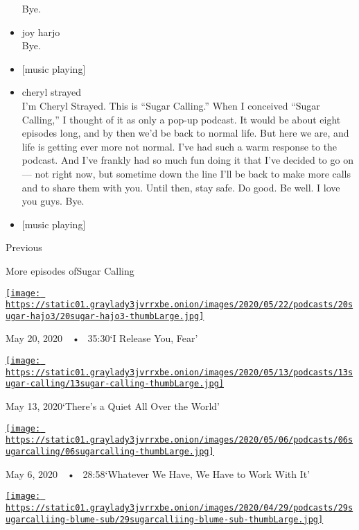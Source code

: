 \begin{itemize}
  Bye.
\item
  joy harjo\\
  Bye.
\item
  {[}music playing{]}
\item
  cheryl strayed\\
  I'm Cheryl Strayed. This is ``Sugar Calling.'' When I conceived
  ``Sugar Calling,'' I thought of it as only a pop-up podcast. It would
  be about eight episodes long, and by then we'd be back to normal life.
  But here we are, and life is getting ever more not normal. I've had
  such a warm response to the podcast. And I've frankly had so much fun
  doing it that I've decided to go on --- not right now, but sometime
  down the line I'll be back to make more calls and to share them with
  you. Until then, stay safe. Do good. Be well. I love you guys. Bye.
\item
  {[}music playing{]}
\end{itemize}

Previous

More episodes ofSugar Calling

\href{https://www.nytimes3xbfgragh.onion/2020/05/20/podcasts/sugar-calling-joy-harjo-poetry-virus.html?action=click\&module=audio-series-bar\&region=header\&pgtype=Article}{\texttt{[image: https://static01.graylady3jvrrxbe.onion/images/2020/05/22/podcasts/20sugar-hajo3/20sugar-hajo3-thumbLarge.jpg]}}

May 20, 2020~~•~ 35:30`I Release You, Fear'

\href{https://www.nytimes3xbfgragh.onion/2020/05/13/podcasts/sugar-calling-billy-collins-poetry-virus.html?action=click\&module=audio-series-bar\&region=header\&pgtype=Article}{\texttt{[image: https://static01.graylady3jvrrxbe.onion/images/2020/05/13/podcasts/13sugar-calling/13sugar-calling-thumbLarge.jpg]}}

May 13, 2020`There's a Quiet All Over the World'

\href{https://www.nytimes3xbfgragh.onion/2020/05/06/podcasts/sugar-calling-alice-walker-quarantine-virus.html?action=click\&module=audio-series-bar\&region=header\&pgtype=Article}{\texttt{[image: https://static01.graylady3jvrrxbe.onion/images/2020/05/06/podcasts/06sugarcalling/06sugarcalling-thumbLarge.jpg]}}

May 6, 2020~~•~ 28:58`Whatever We Have, We Have to Work With It'

\href{https://www.nytimes3xbfgragh.onion/2020/04/29/podcasts/sugar-calling-judy-blume-quarantine-virus.html?action=click\&module=audio-series-bar\&region=header\&pgtype=Article}{\texttt{[image: https://static01.graylady3jvrrxbe.onion/images/2020/04/29/podcasts/29sugarcalliing-blume-sub/29sugarcalliing-blume-sub-thumbLarge.jpg]}}

